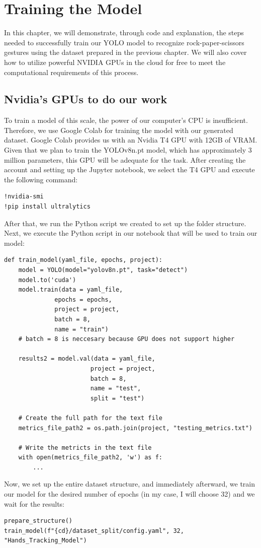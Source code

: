 \documentclass[../main]{subfiles}
\begin{document}
\chapter{Training the Model}

{
\hypersetup{linkcolor=black}
\renewcommand{\contentsname}{Training the Model}
\minitoc %
}
In this chapter, we will demonstrate, through code and explanation, the steps needed to successfully train our YOLO model to recognize rock-paper-scissors gestures using the dataset prepared in the previous chapter. We will also cover how to utilize powerful NVIDIA GPUs in the cloud for free to meet the computational requirements of this process.

\section{Nvidia's GPUs to do our work}
To train a model of this scale, the power of our computer’s CPU is insufficient. Therefore, we use Google Colab for training the model with our generated dataset. Google Colab provides us with an Nvidia T4 GPU with 12GB of VRAM. Given that we plan to train the YOLOv8n.pt model, which has approximately 3 million parameters, this GPU will be adequate for the task. After creating the account and setting up the Jupyter notebook, we select the T4 GPU and execute the following command:
\begin{lstlisting}
!nvidia-smi
!pip install ultralytics
\end{lstlisting}
After that, we run the Python script we created to set up the folder structure. Next, we execute the Python script in our notebook that will be used to train our model:
\begin{lstlisting}
def train_model(yaml_file, epochs, project):
    model = YOLO(model="yolov8n.pt", task="detect")
    model.to('cuda')
    model.train(data = yaml_file,
        	  epochs = epochs,
              project = project,
        	  batch = 8,
              name = "train")          
    # batch = 8 is neccesary because GPU does not support higher

    results2 = model.val(data = yaml_file,
                        project = project,
                        batch = 8,
                        name = "test",
                        split = "test")

    # Create the full path for the text file
    metrics_file_path2 = os.path.join(project, "testing_metrics.txt")

    # Write the metricts in the text file
    with open(metrics_file_path2, 'w') as f:
        ...
\end{lstlisting}
Now, we set up the entire dataset structure, and immediately afterward, we train our model for the desired number of epochs (in my case, I will choose 32) and we wait for the results:
\begin{lstlisting}
prepare_structure()
train_model(f"{cd}/dataset_split/config.yaml", 32, "Hands_Tracking_Model")
\end{lstlisting}
\end{document}
